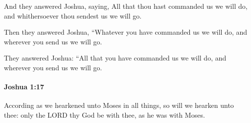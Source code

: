 			\begin{versebox}
					\item[BHS] 
					\item[ASV] And they answered Joshua, saying, All that thou hast commanded us we will do, and whithersoever thou sendest us we will go.
					\item[NIV] Then they answered Joshua, “Whatever you have commanded us we will do, and wherever you send us we will go.
					\item[NRSV] They answered Joshua: “All that you have commanded us we will do, and wherever you send us we will go.
			\end{versebox}

		\paragraph{Joshua 1:17} %
			\label{JOSHUA-1-17}

			According as we hearkened unto Moses in all things, so will we hearken unto thee: only the LORD thy God be with thee, as he was with Moses.

